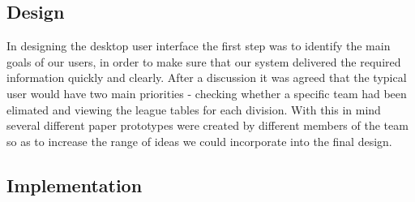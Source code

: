 \subsection{Design}
In designing the desktop user interface the first step was to identify the
main goals of our users, in order to make sure that our system delivered
the required information quickly and clearly. After a discussion it was 
agreed that the typical user would have two main priorities - checking 
whether a specific team had been elimated and viewing the league tables for
each division. With this in mind several different paper prototypes were
created by different members of the team so as to increase the range of
ideas we could incorporate into the final design.
\subsection{Implementation}
